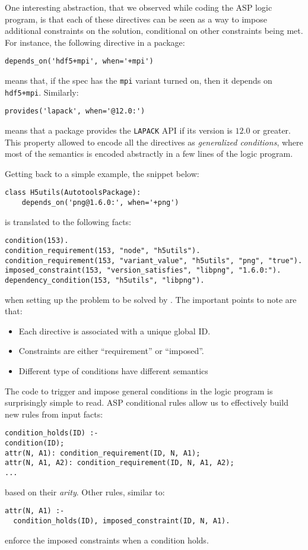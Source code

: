 One interesting abstraction, that we observed while coding the ASP logic program, is
that each of these directives can be seen as a way to impose additional constraints on
the solution, conditional on other constraints being met. For instance, the following
directive in a package:
%
\begin{verbatim}
depends_on('hdf5+mpi', when='+mpi')
\end{verbatim}
%
means that, if the spec has the {\tt mpi} variant turned on, then it depends on {\tt hdf5+mpi}. Similarly:
%
\begin{verbatim}
provides('lapack', when='@12.0:')
\end{verbatim}
%
means that a package provides the {\tt LAPACK} API if its version is $12.0$ or greater.
This property allowed to encode all the directives as \emph{generalized conditions}, where most of the semantics is encoded abstractly in a few lines of the logic program.

Getting back to a simple example, the snippet below:
%
\begin{verbatim}
class H5utils(AutotoolsPackage):
    depends_on('png@1.6.0:', when='+png')
\end{verbatim}
%
is translated to the following facts:
%
\begin{verbatim}
condition(153).
condition_requirement(153, "node", "h5utils").
condition_requirement(153, "variant_value", "h5utils", "png", "true").
imposed_constraint(153, "version_satisfies", "libpng", "1.6.0:").
dependency_condition(153, "h5utils", "libpng").
\end{verbatim}
%
when setting up the problem to be solved by \clingo. The important points to note are that:

\begin{itemize}
\item Each directive is associated with a unique global ID.
\item Constraints are either ``requirement'' or ``imposed''.
\item Different type of conditions have different semantics\footnotemark
\end{itemize}

The code to trigger and impose general conditions in the logic program is surprisingly simple to read. ASP conditional rules allow us to effectively build new rules from input facts:
%
\begin{verbatim}
condition_holds(ID) :-
condition(ID);
attr(N, A1): condition_requirement(ID, N, A1);
attr(N, A1, A2): condition_requirement(ID, N, A1, A2);
...
\end{verbatim}
%
based on their \emph{arity}. Other rules, similar to:
%
\begin{verbatim}
attr(N, A1) :-
  condition_holds(ID), imposed_constraint(ID, N, A1).
\end{verbatim}
%
enforce the imposed constraints when a condition holds.

